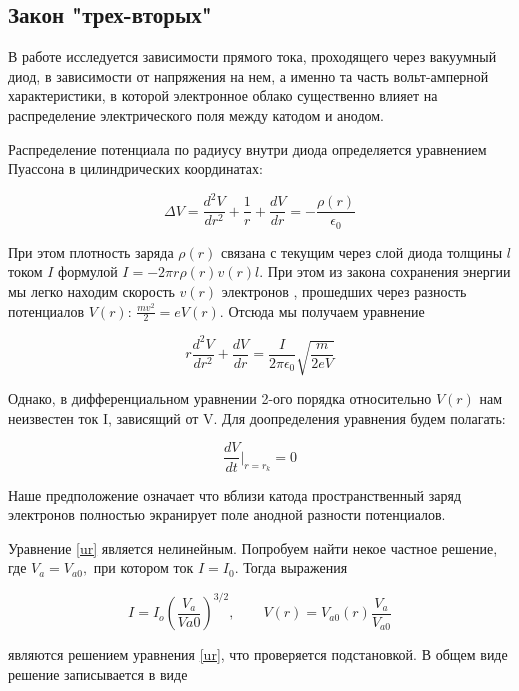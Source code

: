 \documentclass[a4paper, 12pt]{article}%
\begin{document}
	\subsection*{Закон "трех-вторых"}
	В работе исследуется зависимости прямого тока, проходящего через вакуумный диод, в зависимости от напряжения на нем, а именно та часть вольт-амперной характеристики, в которой электронное облако существенно влияет на распределение электрического поля между катодом и анодом.
	
	Распределение потенциала по радиусу внутри диода определяется уравнением Пуассона в цилиндрических координатах:
	
	\begin{equation}\label{}
		\Delta V = \dfrac{d^2V}{dr^2} + \dfrac{1}{r} + \dfrac{dV}{dr} = - \dfrac{\rho(r)}{\epsilon_0}
	\end{equation}
	
	При этом плотность заряда $ \rho(r) $ связана с текущим через слой диода толщины $ l $ током $ I $ формулой $ I = -2\pi r \rho(r)v(r)l$. При этом из закона сохранения энергии мы легко находим скорость $ v(r) $ электронов , прошедших через разность потенциалов $ V(r) $: $ \frac{mv^2}{2} = eV(r) $.  Отсюда мы получаем уравнение 
	
	\begin{equation}\label{ur}
		r \dfrac{d^2V}{dr^2} + \dfrac{dV}{dr} = \dfrac{I}{2\pi\epsilon_0}\sqrt{\dfrac{m}{2eV}}
	\end{equation}
	
	Однако, в дифференциальном уравнении 2-ого порядка относительно $ V(r) $ нам неизвестен ток I, зависящий от V. Для доопределения уравнения будем полагать:
	
	\begin{equation}\label{usl}
		\dfrac{dV}{dt}\bigg |_{r=r_k} = 0
	\end{equation} 
	
	Наше предположение означает что вблизи катода пространственный заряд электронов полностью экранирует поле анодной разности потенциалов.
	
	Уравнение \eqref{ur} является нелинейным. Попробуем  найти некое частное решение, где $ V_a = V_{a0}, $ при котором ток $ I = I_0 $. Тогда выражения 
	
	\begin{equation}\label{}
		I = I_o \left( \dfrac{V_a}{V{a0}} \right) ^{3/2}, \qquad V(r) = V_{a0}(r)\dfrac{V_a}{V_{a0}}
	\end{equation}
	
	являются решением уравнения \eqref{ur}, что проверяется подстановкой. В общем виде решение записывается в виде
	
\end{document}
